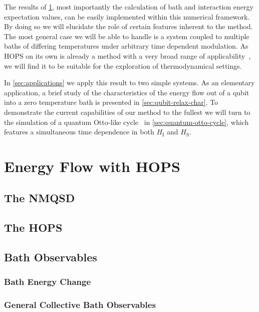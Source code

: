 \documentclass[reprint,aps,superscriptaddress]{revtex4-2}
\def\sys{\ensuremath{\mathrm{S}}}
\def\inter{\ensuremath{\mathrm{I}}}
\begin{document}
The results of \cref{sec:flow}, most importantly the calculation of
bath and interaction energy expectation values, can be easily
implemented within this numerical framework. By doing so we will
elucidate the role of certain features inherent to the method. The
most general case we will be able to handle is a system coupled to
multiple baths of differing temperatures under arbitrary time
dependent modulation. As HOPS on its own is already a method with a
very broad range of applicability~\cite{RichardDiss}, we will find it
to be suitable for the exploration of thermodynamical settings.

In \cref{sec:applications} we apply this result to two simple systems.
As an elementary application, a brief study of the characteristics of
the energy flow out of a qubit into a zero temperature bath is
presented in \cref{sec:qubit-relax-char}. To demonstrate the current
capabilities of our method to the fullest we will turn to the
simulation of a quantum Otto-like
cycle~\cite{cite:Geva1992Feb,cite:Wiedmann2020Mar,cite:Wiedmann2021Jun}
in \cref{sec:quantum-otto-cycle}, which features a simultaneous time
dependence in both \(H_{\inter}\) and \(H_{\sys}\).

\section{Energy Flow with HOPS}
\label{sec:flow}

\subsection{The NMQSD}
\label{sec:nmqsd}

\subsection{The HOPS}
\label{sec:hops}

\subsection{Bath Observables}
\label{sec:bath-observables}

\subsubsection{Bath Energy Change}
\label{sec:bath-energy-change}

\subsubsection{General Collective Bath Observables}
\label{sec:gener-coll-bath}
\end{document}
